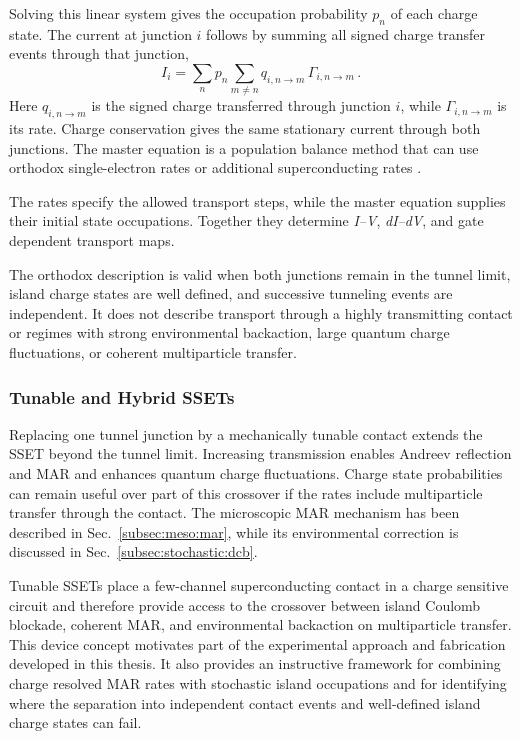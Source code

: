             Solving this linear system gives the occupation probability $p_n$ of each charge state. The current at junction $i$ follows by summing all signed charge transfer events through that junction,
            \begin{equation}
                I_i = \sum_n p_n\sum_{m\neq n}q_{i,n\to m}\,\Gamma_{i,n\to m}\,.
                \label{eq:stochastic:set-current}
            \end{equation}
            Here $q_{i,n\to m}$ is the signed charge transferred through junction $i$, while $\Gamma_{i,n\to m}$ is its rate. Charge conservation gives the same stationary current through both junctions. The master equation is a population balance method that can use orthodox single-electron rates or additional superconducting rates \cite{ingold_charge_1992,grabert_single_2013}.

            The rates specify the allowed transport steps, while the master equation supplies their initial state occupations. Together they determine \textit{I--V}, \textit{dI--dV}, and gate dependent transport maps.

            The orthodox description is valid when both junctions remain in the tunnel limit, island charge states are well defined, and successive tunneling events are independent. It does not describe transport through a highly transmitting contact or regimes with strong environmental backaction, large quantum charge fluctuations, or coherent multiparticle transfer.

        \subsubsection*{Tunable and Hybrid SSETs}

            Replacing one tunnel junction by a mechanically tunable contact extends the SSET beyond the tunnel limit. Increasing transmission enables Andreev reflection and MAR and enhances quantum charge fluctuations. Charge state probabilities can remain useful over part of this crossover if the rates include multiparticle transfer through the contact. The microscopic MAR mechanism has been described in Sec.~\ref{subsec:meso:mar}, while its environmental correction is discussed in Sec.~\ref{subsec:stochastic:dcb}.

            Tunable SSETs place a few-channel superconducting contact in a charge sensitive circuit and therefore provide access to the crossover between island Coulomb blockade, coherent MAR, and environmental backaction on multiparticle transfer. This device concept motivates part of the experimental approach and fabrication developed in this thesis. It also provides an instructive framework for combining charge resolved MAR rates with stochastic island occupations and for identifying where the separation into independent contact events and well-defined island charge states can fail.

